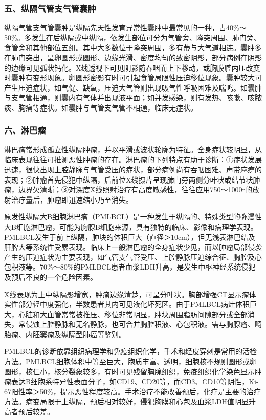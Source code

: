 \subsubsection{五、纵隔气管支气管囊肿}

纵隔气管支气管囊肿是纵隔先天性发育异常性囊肿中最常见的一种，占40\%～50\%。多发生在后纵隔或中纵隔，依发生部位可分为气管旁、隆突周围、肺门旁、食管旁和其他部位五组。其中大多数位于隆突周围，多有蒂与大气道相连。囊肿多在肺门突出，呈卵圆形或圆形、边缘光滑、密度均匀的致密阴影，部分病例在阴影的边缘可见弧状钙化。X线透视下可见阴影随吞咽而上下移动，或胸膜腔内压改变时囊肿有变形现象。卵圆形密影有时可引起食管局限性压迫移位现象。囊肿较大可产生压迫症状，如气促、缺氧，压迫大气管则出现吸气性呼吸困难及喘鸣。如囊肿与支气管相通，则囊内有气体并出现液平面；如并发感染，则有发热、咳嗽、咳脓痰、胸痛等症状。如囊肿与气管支气管不相通，临床无症状。

\subsubsection{六、淋巴瘤}

淋巴瘤常形成孤立性纵隔肿瘤，并以平滑或波状轮廓为特征。全身症状较明显，从临床表现往往可推测恶性肿瘤的存在。淋巴瘤的下列特点有助于诊断：①症状发展迅速，很快出现上腔静脉与气管受压的症状，部分病例尚有吞咽困难、声带麻痹的表现；②肿瘤首先侵犯中纵隔，后前位X线摄片呈现肺门旁两侧分叶状或结节状肿瘤，边界欠清晰；③对深度X线照射治疗有高度敏感性，往往应用750～1000r的放射治疗量后，肿瘤即迅速缩小乃至消失。

原发性纵隔大B细胞淋巴瘤（PMLBCL）是一种发生于纵隔的、特殊类型的弥漫性大B细胞淋巴瘤，可能为胸腺B细胞来源，具有独特的临床、影像和病理学表现。PMLBCL发生于前上纵隔，肿块的体积巨大（直径＞10cm），但无浅表淋巴结及肝脾大等系统性受累表现。临床上一般淋巴瘤的全身症状少见，而以肿瘤局部侵袭产生的压迫症状为主要表现，如气管支气管受压、上腔静脉压迫综合征、胸腔及心包积液等。70\%～80\%的PMLBCL患者血浆LDH升高，是发生中枢神经系统侵犯及预后不良的一个危险因素。

X线表现为上中纵隔影增宽，肿瘤边缘清楚，可呈分叶状。胸部增强CT显示瘤体实性部分轻中度强化，半数患者其内可见液化坏死区。由于PMLBCL病灶体积巨大，心脏和大血管常常被推压、移位非常明显，肿块周围脂肪间隙部分或全部消失，常侵蚀上腔静脉和无名静脉，也可合并胸腔积液、心包积液。需与胸腺瘤、畸胎瘤、内胚窦瘤及纵隔型肺癌等鉴别。

PMLBCL的诊断依靠组织病理学和免疫组织化学，手术和经皮穿刺是常用的活检方法。PMLBCL细胞体积中等至巨大，胞质丰富、透明，细胞核不规则圆形或卵圆形，核仁小，核分裂象较多，有时可见残留胸腺组织，免疫组织化学染色显示肿瘤表达B细胞系特异性表面分子，如CD19、CD20等，而CD3、CD10等阴性，Ki-67阳性率＞50\%，提示恶性程度较高。手术治疗不能改善预后，化疗是主要的治疗方法。病变局限于上纵隔，预后相对较好，侵犯胸膜和心包及血浆LDH值明显升高者预后较差。

